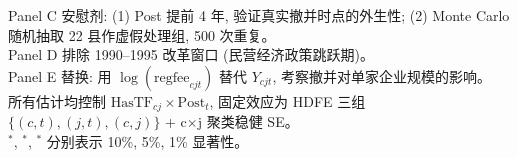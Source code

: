 \begin{table}[htbp]
\begin{flushleft}
Panel C 安慰剂: (1) Post 提前 4 年, 验证真实撤并时点的外生性; (2) Monte Carlo
随机抽取 22 县作虚假处理组, 500 次重复。\\
Panel D 排除 1990--1995 改革窗口 (民营经济政策跳跃期)。\\
Panel E 替换: 用 $\log(\mathrm{regfee}_{cjt})$ 替代 $Y_{cjt}$, 考察撤并对单家企业规模的影响。\\
所有估计均控制 $\mathrm{HasTF}_{cj}\times\mathrm{Post}_t$, 固定效应为 HDFE 三组
$\{(c,t),(j,t),(c,j)\}$ + c$\times$j 聚类稳健 SE。\\
$^{*}$, $^{{*}}$, $^{{*}}$ 分别表示 10\%, 5\%, 1\% 显著性。
\end{flushleft}
\end{table}
